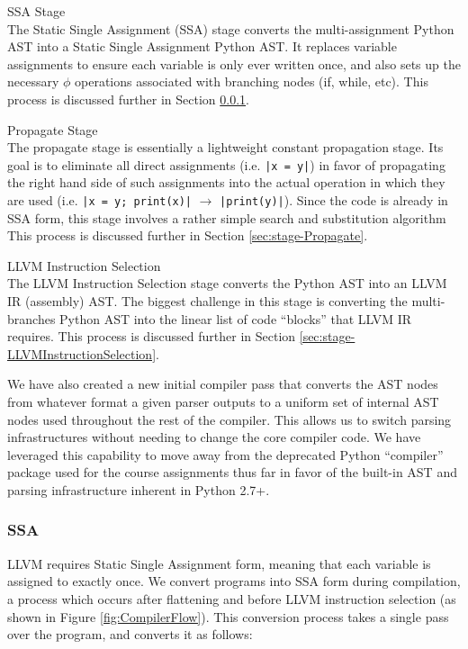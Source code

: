 \documentclass[11pt,twocolumn]{article}
\newenvironment{packed_desc}{
\begin{description}
  \setlength{\itemsep}{1pt}
  \setlength{\parskip}{0pt}
  \setlength{\parsep}{0pt}
}{\end{description}}
\begin{document}
\begin{packed_desc}
\item[SSA Stage] \hfill \\
  The Static Single Assignment (SSA) stage converts
  the multi-assignment Python AST into a Static Single Assignment
  Python AST. It replaces variable assignments to ensure each variable
  is only ever written once, and also sets up the necessary $\phi$ operations
  associated with branching nodes (if, while, etc).
  This process is discussed further in Section \ref{sec:stage-SSA}.
\item[Propagate Stage] \hfill \\
  The propagate stage is essentially a
  lightweight constant propagation stage. Its goal is to eliminate
  all direct assignments (i.e. \texttt{|x = y|}) in favor of propagating
  the right hand side of such assignments into the actual operation in
  which they are used (i.e. \texttt{|x = y; print(x)|} $\rightarrow$
  \texttt{|print(y)|}). Since the code is already in SSA form, this
  stage involves a rather simple search and substitution algorithm
  This process is discussed further in Section \ref{sec:stage-Propagate}.
\item[LLVM Instruction Selection] \hfill \\
  The LLVM Instruction Selection stage
  converts the Python AST into an LLVM IR (assembly) AST. The biggest
  challenge in this stage is converting the multi-branches Python AST
  into the linear list of code ``blocks'' that LLVM IR requires. This
  process is discussed further in Section
  \ref{sec:stage-LLVMInstructionSelection}.
\end{packed_desc}

We have also created a new initial compiler pass that converts the AST
nodes from whatever format a given parser outputs to a uniform set of
internal AST nodes used throughout the rest of the compiler. This
allows us to switch parsing infrastructures without needing to change
the core compiler code. We have leveraged this capability to move away
from the deprecated Python ``compiler'' package used for the course
assignments thus far in favor of the built-in AST and parsing
infrastructure inherent in Python 2.7+.

\subsubsection{SSA}
\label{sec:stage-SSA}

LLVM requires Static Single Assignment form, meaning that each
variable is assigned to exactly once.  We convert programs into SSA
form during compilation, a process which
occurs after flattening and before LLVM instruction
selection (as shown in Figure \ref{fig:CompilerFlow}).  This
conversion process takes a single pass over the program, and converts
it as follows:
\end{document}
